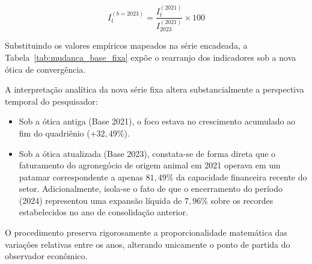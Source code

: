 \documentclass[12pt,a4paper]{article}
\begin{document}
\begin{equation}
\label{eq:formula_mudanca_base}
I_{t}^{(b=2023)} = \frac{I_t^{(2021)}}{I_{2023}^{(2021)}} \times 100
\end{equation}

Substituindo os valores empíricos mapeados na série encadeada, a Tabela~\ref{tab:mudanca_base_fixa} expõe o rearranjo dos indicadores sob a nova ótica de convergência.



\begin{table}[H]%
\centering
\caption{Efeito da Mudança de Base Fixa sobre o Índice Agregado de Valor.}
\label{tab:mudanca_base_fixa}
\end{table}

A interpretação analítica da nova série fixa altera substancialmente a perspectiva temporal do pesquisador:
\begin{itemize}
    \item Sob a ótica antiga (Base 2021), o foco estava no crescimento acumulado ao fim do quadriênio ($+32,49\%$).
    \item Sob a ótica atualizada (Base 2023), constata-se de forma direta que o faturamento do agronegócio de origem animal em 2021 operava em um patamar correspondente a apenas $81,49\%$ da capacidade financeira recente do setor. Adicionalmente, isola-se o fato de que o encerramento do período (2024) representou uma expansão líquida de $7,96\%$ sobre os recordes estabelecidos no ano de consolidação anterior.
\end{itemize}

O procedimento preserva rigorosamente a proporcionalidade matemática das variações relativas entre os anos, alterando unicamente o ponto de partida do observador econômico.



\end{document}
